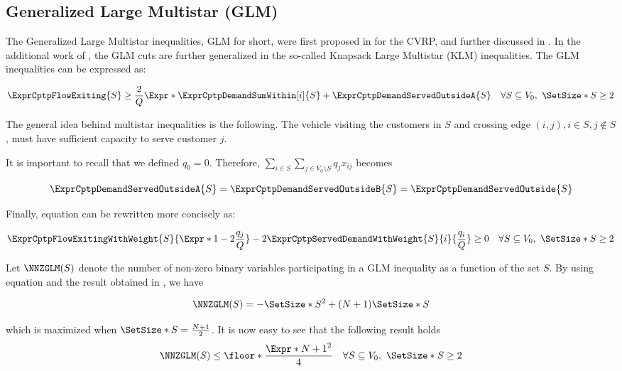 \subsection{Generalized Large Multistar (GLM)}
\label{sec:cptp-glm}

The Generalized Large Multistar inequalities, GLM for short, were first proposed in \cite{gouveia1995} for the CVRP, and further discussed in \cite{letchford2006}.
In the additional work of \cite{letchford2002}, the GLM cuts are further generalized in the so-called Knapsack Large Multistar (KLM) inequalities.
The GLM inequalities can be expressed as:

\begin{equation}
	\label{eq:glm-inequality-v1}
	\begin{split}
		\ExprCptpFlowExiting{S} \ge \frac{2}{Q} \Expr*{  \ExprCptpDemandSumWithin[i]{S} + \ExprCptpDemandServedOutsideA{S} } \quad \forall S \subseteq V_0,\ \SetSize*{S} \ge 2
	\end{split}
\end{equation}

The general idea behind multistar inequalities is the following.
The vehicle visiting the customers in $S$ and crossing edge $(i, j), i \in S, j \notin S$,
must have sufficient capacity to serve customer $j$.

It is important to recall that we defined $q_0 = 0$.
Therefore, $\sum_{i \in S} \sum_{j \in V_0 \setminus S} q_j  x_{ij}$ becomes

\begin{equation}
	\ExprCptpDemandServedOutsideA{S} = \ExprCptpDemandServedOutsideB{S} =\ExprCptpDemandServedOutside{S}
\end{equation}

Finally, equation  can be rewritten more concisely as:

\begin{equation}
	\label{eq:glm-inequality}
	\begin{split}
		\ExprCptpFlowExitingWithWeight{S}{\Expr*{1 - 2 \frac{q_j}{Q}}} - 2 	\ExprCptpServedDemandWithWeight{S}{i}{\frac{q_i}{Q}}  \ge  0   \quad \forall S \subseteq V_0,\ \SetSize*{S} \ge 2
	\end{split}
\end{equation}

Let $\NNZGLM(S)$ denote the number of non-zero binary variables participating in a GLM inequality as a function of the set $S$.
By using equation  and the result obtained in , we have

\begin{equation}
	\NNZGLM(S) = -\SetSize*{S}^2 + (N + 1)\SetSize*{S}
\end{equation}

which is maximized when $\SetSize*{S} = \frac{N+1}{2}$.
It is now easy to see that the following result holds
\begin{equation}
	\label{eq:glm-nnz-ub}
	\NNZGLM(S) \le \floor*{ \frac{\Expr*{N + 1}^2}{4}} \quad \forall S \subseteq V_0,\ \SetSize*{S} \ge 2
\end{equation}
